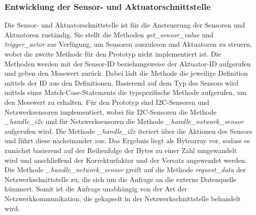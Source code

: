 \subsubsection{Entwicklung der Sensor- und Aktuatorschnittstelle}
Die Sensor- und Aktuatorschnittstelle ist für die Ansteuerung der Sensoren und Aktuatoren zuständig.
Sie stellt die Methoden \emph{get\_sensor\_value} und \emph{trigger\_actor} zur Verfügung, um Sensoren auszulesen und Aktuatoren zu steuern, wobei die zweite Methode für den Prototyp nicht implementiert ist.
Die Methoden werden mit der Sensor-ID beziehungsweise der Aktuator-ID aufgerufen und geben den Messwert zurück.
Dabei lädt die Methode die jeweilige Definition mittels der ID aus den Definitionen.
Basierend auf dem Typ des Sensors wird mittels eines Match-Case-Statements die typspezifische Methode aufgerufen, um den Messwert zu erhalten.
Für den Prototyp sind I2C-Sensoren und Netzwerksensoren implementiert, wobei für I2C-Sensoren die Methode \emph{\_handle\_i2c} und für Netzwerksensoren die Methode \emph{\_handle\_network\_sensor} aufgerufen wird.
Die Methode \emph{\_handle\_i2c} iteriert über die Aktionen des Sensors und führt diese nacheinander aus.
Das Ergebnis liegt als Bytearray vor, sodass es zunächst basierend auf der Reihenfolge der Bytes zu einer Zahl umgewandelt wird und anschließend der Korrekturfaktor und der Versatz angewendet werden.
Die Methode \emph{\_handle\_network\_sensor} greift auf die Methode \emph{request\_data} der Netzwerkschnittstelle zu, die sich um die Anfrage an die externe Datenquelle kümmert.
Somit ist die Anfrage unabhängig von der Art der Netzwerkkommunikation, die gekapselt in der Netzwerkschnittstelle behandelt wird.

